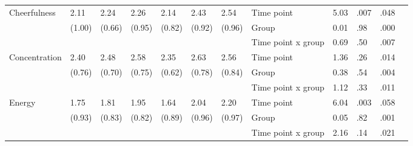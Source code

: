 \documentclass[authordate, empirical]{jote-new-article}
\begin{document}
\begin{table}[th!]
\begin{fullwidth}
{\begin{tabular}{@{} l l l l l l l | l l l l l @{}}
        \hline Cheerfulness                            & 2.11                                          & 2.24                 & 2.26                 & 2.14          & 2.43                                  & 2.54   & Time point         & 5.03 & .007 & .048 \\
                                                       & (1.00)                                        & (0.66)               & (0.95)               & (0.82)        & (0.92)                                & (0.96) & Group              & 0.01 & .98  & .000 \\
                                                       &                                               &                      &                      &               &                                       &        & Time point x group & 0.69 & .50  & .007 \\

        \hline Concentration                           & 2.40                                          & 2.48                 & 2.58                 & 2.35          & 2.63                                  & 2.56   & Time point         & 1.36 & .26  & .014 \\
                                                       & (0.76)                                        & (0.70)               & (0.75)               & (0.62)        & (0.78)                                & (0.84) & Group              & 0.38 & .54  & .004 \\
                                                       &                                               &                      &                      &               &                                       &        & Time point x group & 1.12 & .33  & .011 \\

        \hline Energy                                  & 1.75                                          & 1.81                 & 1.95                 & 1.64          & 2.04                                  & 2.20   & Time point         & 6.04 & .003 & .058 \\
                                                       & (0.93)                                        & (0.83)               & (0.82)               & (0.89)        & (0.96)                                & (0.97) & Group              & 0.05 & .82  & .001 \\
                                                       &                                               &                      &                      &               &                                       &        & Time point x group & 2.16 & .14  & .021 \\



\end{tabular}}
\end{fullwidth}
\end{table}
\end{document}
